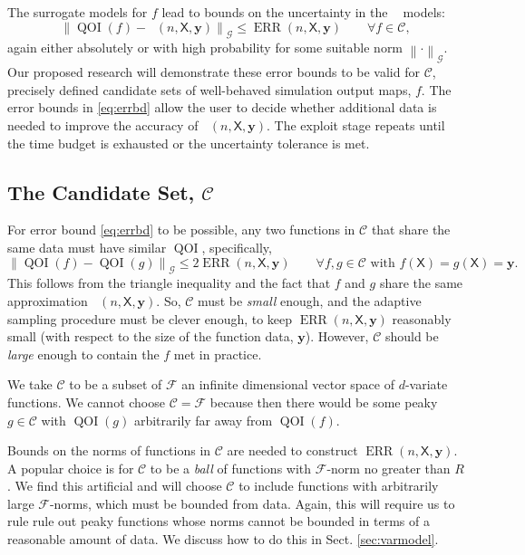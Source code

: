 \documentclass[11pt]{NSFamsart}
\DeclareMathOperator{\QOI}{QOI} %
\DeclareMathOperator{\APP}{\widehat{\QOI}}
\DeclareMathOperator{\ERR}{ERR}
\newcommand{\mX}{\mathsf{X}}
\newcommand{\by}{{\boldsymbol{y}}}
\newcommand{\calc}{{\mathcal{C}}}
\newcommand{\calf}{{\mathcal{F}}}
\newcommand{\calg}{{\mathcal{G}}}
\newcommand{\norm}[2][{}]{\ensuremath{\left \lVert #2 \right \rVert}_{#1}}
\newcommand{\bignorm}[2][{}]{\ensuremath{\bigl \lVert #2 \bigr \rVert}_{#1}}
\begin{document}
The surrogate models for $f$ lead to bounds on the uncertainty in the $\APP$ models:
\begin{equation} \label{eq:errbd}
\bignorm[\calg]{\QOI(f) - \APP(n,\mX,\by)} \le \ERR(n,\mX,\by) \qquad \forall f \in \calc,
\end{equation}
again either absolutely or with high probability for some suitable norm $\norm[\calg]{\cdot}$. Our proposed research will demonstrate these error bounds to be valid for $\calc$, precisely defined candidate sets of well-behaved simulation output maps, $f$. The error bounds in \eqref{eq:errbd} allow the user to decide whether additional data is needed to improve the accuracy of $\APP(n,\mX,\by)$. The exploit stage repeats until the time budget is exhausted or the uncertainty tolerance is met.

\subsection{The Candidate Set, $\calc$} 
For error bound \eqref{eq:errbd}  to be possible, any two functions in $\calc$ that share the same data must have similar $\QOI$, specifically, 
\begin{equation} \label{eq:Csmall}
	\bignorm[\calg]{\QOI(f) - \QOI(g)} \le 2 \ERR(n,\mX,\by) \qquad \forall f, g \in \calc \text{ with } f(\mX) = g(\mX) = \by.
\end{equation}
This follows from the triangle inequality and the fact that $f$ and $g$ share the same approximation $\APP(n,\mX,\by)$. So, $\calc$ must be \emph{small} enough, and the adaptive sampling procedure must be clever enough, to keep $\ERR(n,\mX,\by)$ reasonably small (with respect to the size of the function data, $\by$).  However, $\calc$ should be \emph{large} enough to contain the $f$ met in practice.

We take $\calc$ to be a subset of $\calf$ an infinite dimensional vector space of $d$-variate functions. We cannot choose $\calc = \calf$ because then there would be some peaky $g \in \calc$ with $\QOI(g)$ arbitrarily far away from $\QOI(f)$. 

Bounds on the norms of functions in  $\calc$ are needed to construct $\ERR(n,\mX,\by)$.  A popular choice is for $\calc$ to be a \emph{ball} of functions with $\calf$-norm no greater than $R$.  We find this artificial and will choose $\calc$ to include functions with arbitrarily large $\calf$-norms, which must be bounded from data.  Again, this will require us to rule rule out peaky functions whose norms cannot be bounded in terms of a reasonable amount of data.  We discuss how to do this in Sect. \ref{sec:varmodel}.
\end{document}
